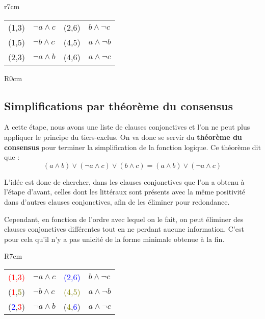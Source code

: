 \begin{wrapfigure}{r}{7cm}
\vspace{-0.2cm}
\centering
\begin{tabular}{r|lr|l}
\toprule
\rowcolor{GT1} (1,3) & $\neg a \wedge c$ & (2,6) & $b \wedge \neg c$ \\
\rowcolor{GT2} (1,5) & $\neg b \wedge c$ & (4,5) & $a \wedge \neg b$ \\
\rowcolor{GT1} (2,3) & $\neg a \wedge b$ & (4,6) & $a \wedge \neg c$ \\
\bottomrule
\end{tabular}
\end{wrapfigure}


\begin{wrapfigure}{R}{0cm}
\end{wrapfigure}

\subsection{Simplifications par théorème du consensus}
\label{subsec:mot_to_logic/simplification/consensus}
\par
A cette étape, nous avons une liste de clauses conjonctives et l'on ne peut plus appliquer le principe du tiers-exclus. On va donc se servir du \textbf{théorème du consensus} pour terminer la simplification de la fonction logique. Ce théorème dit que :
$$(a \wedge b) \vee (\neg a \wedge c) \vee (b \wedge c) = (a \wedge b) \vee (\neg a \wedge c)$$
\par
L'idée est donc de chercher, dans les clauses conjonctives que l'on a obtenu à l'étape d'avant, celles dont les littéraux sont présents avec la même positivité dans d'autres clauses conjonctives, afin de les éliminer pour redondance.
\par
Cependant, en fonction de l'ordre avec lequel on le fait, on peut éliminer des clauses conjonctives différentes tout en ne perdant aucune information. C'est pour cela qu'il n'y a pas unicité de la forme minimale obtenue à la fin.\\

\begin{wrapfigure}{R}{7cm}
\vspace{0.2cm}
\centering
\begin{tabular}{r|lr|l}
\toprule
\rowcolor{GT1} \textcolor{red}{(1,3)} & $\neg a \wedge c$ & \textcolor{blue}{(2,6)} & $b \wedge \neg c$ \\
\rowcolor{GT2} (\textcolor{red}{1},\textcolor{olive}{5}) & $\neg b \wedge c$ & \textcolor{olive}{(4,5)} & $a \wedge \neg b$ \\
\rowcolor{GT1} (\textcolor{blue}{2},\textcolor{red}{3}) & $\neg a \wedge b$ & (\textcolor{olive}{4},\textcolor{blue}{6}) & $a \wedge \neg c$ \\
\bottomrule
\end{tabular}
\end{wrapfigure}

